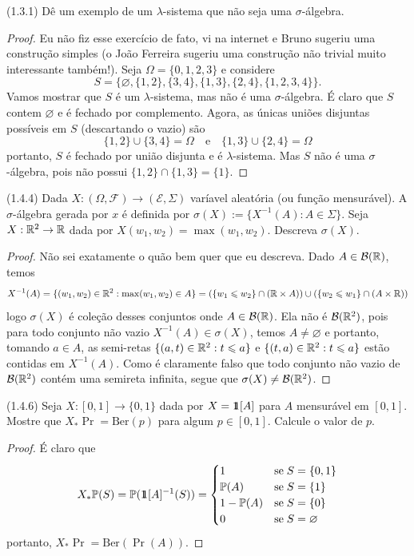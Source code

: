 \begin{exercise}
	(1.3.1)
	Dê um exemplo de um $\lambda$-sistema que não seja uma $\sigma$-álgebra.
\end{exercise}
\begin{proof}
	Eu não fiz esse exercício de fato, vi na internet e Bruno sugeriu
	uma construção simples (o João Ferreira
	sugeriu uma construção não trivial muito interessante também!). Seja
	$\Omega = \{0,1,2,3\}$ e considere
	\[
		S = \{\varnothing, \{1,2\}, \{3,4\}, \{1,3\}, \{2,4\}, \{1,2,3,4\}\}.
	\]
	Vamos mostrar que $S$ é um $\lambda$-sistema, mas não é uma
	$\sigma$-álgebra. É claro que $S$ contem $\varnothing$ e é
	fechado por complemento. Agora, as únicas uniões disjuntas possíveis
	em $S$ (descartando o vazio) são
	\[
		\{1,2\} \cup \{3,4\} = \Omega \quad \text{e} \quad \{1,3\} \cup
		\{2,4\} = \Omega
	\]
	portanto, $S$ é fechado por união disjunta e é $\lambda$-sistema.
	Mas $S$ não é uma $\sigma$-álgebra, pois não possui $\{1,2\} \cap
	\{1,3\} = \{1\}$.
\end{proof}

\begin{exercise}
	(1.4.4)
	Dada $X : (\Omega, \mathcal{F}) \to (\mathcal{E}, \Sigma)$ varíavel
	aleatória (ou função mensurável). A $\sigma$-álgebra
	gerada por $x$ é definida por $\sigma(X) := \{X^{-1}(A) : A \in
	\Sigma\}$. Seja $X:\mathbb{R}^2 \rightarrow \mathbb{R}$ dada por $X(w_1,w_2) = \max(w_1,w_2)$.
	Descreva $\sigma(X)$.
\end{exercise}

\begin{proof}
	Não sei exatamente o quão bem quer que eu descreva. Dado $A \in
	\mathcal{B}(\mathbb{R})$, temos
	\[
		X^{-1}(A) = \{(w_1,w_2) \in \mathbb{R}^2 : \max(w_1,w_2) \in A\} =
		(\{w_1 \leqslant w_2\} \cap (\mathbb{R} \times A)) \cup (\{w_2 \leqslant w_1\} \cap
		(A \times \mathbb{R}))
	\]
	logo $\sigma(X)$ é coleção desses conjuntos onde $A \in
	\mathcal{B}(\mathbb{R})$. Ela não é $\mathcal{B}(\mathbb{R}^2)$,
	pois para todo conjunto não vazio $X^{-1}(A) \in \sigma(X)$, temos
	$A\neq \varnothing$
	e portanto, tomando $a \in A$, as semi-retas $\{(a, t) \in \mathbb{R}^2: t
	\leqslant a\}$ e $\{(t, a) \in \mathbb{R}^2: t \leqslant a\}$  estão contidas em
	$X^{-1}(A)$. Como é
	claramente falso que todo conjunto não vazio de $\mathcal{B}(\mathbb{R}^2)$
	contém uma semireta infinita, segue que $\sigma(X) \neq \mathcal{B}(\mathbb{R}^2)$.
\end{proof}

\begin{exercise}
	(1.4.6)
	Seja $X : [0,1] \to \{0,1\}$ dada por $X = \hbox{$1\mkern-6.5mu1$}[A]$ para $A$
	mensurável em $[0,1]$. Mostre que $X_*\Pr = \text{Ber}(p)$ para
	algum $p \in [0,1]$. Calcule o valor de $p$.
\end{exercise}
\begin{proof}
	É claro que
	\[
		X_*\mathbb{P}(S) = \mathbb{P}(\hbox{$1\mkern-6.5mu1$}[A]^{-1}(S)) =
		\begin{cases}
			1 & \text{se}\; S = \{0,1\}\\
			\mathbb{P}(A) & \text{se}\; S = \{1\}\\
			1 - \mathbb{P}(A) & \text{se}\; S = \{0\}\\
			0 & \text{se}\; S = \varnothing\\
		\end{cases}
	\]
	portanto, $X_*\Pr = \text{Ber}(\Pr(A))$.
\end{proof}

